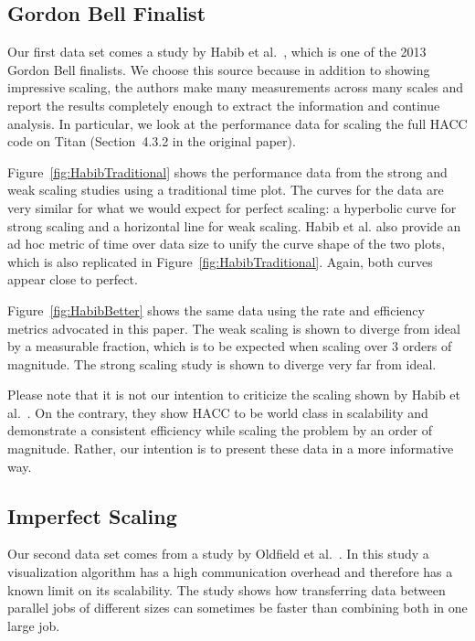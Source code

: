 \documentclass[conference]{IEEEtran}
\newcommand*{\scite}[1]{~\cite{#1}}
\newcommand{\etal}{et al.\xspace}
\begin{document}
\subsection{Gordon Bell Finalist}

\noindent
Our first data set comes a study by Habib \etal\scite{Habib2013}, which is
one of the 2013 Gordon Bell finalists. We choose this source because in
addition to showing impressive scaling, the authors make many measurements
across many scales and report the results completely enough to extract the
information and continue analysis. In particular, we look at the
performance data for scaling the full HACC code on Titan (Section~4.3.2 in
the original paper).

Figure~\ref{fig:HabibTraditional} shows the performance data from the
strong and weak scaling studies using a traditional time plot. The curves
for the data are very similar for what we would expect for perfect scaling:
a hyperbolic curve for strong scaling and a horizontal line for weak
scaling. Habib \etal also provide an ad hoc metric of time over data size
to unify the curve shape of the two plots, which is also replicated in
Figure~\ref{fig:HabibTraditional}. Again, both curves appear close to
perfect.

Figure~\ref{fig:HabibBetter} shows the same data using the rate and
efficiency metrics advocated in this paper. The weak scaling is shown to
diverge from ideal by a measurable fraction, which is to be expected when
scaling over 3 orders of magnitude. The strong scaling study is shown to
diverge very far from ideal.

Please note that it is not our intention to criticize the scaling shown by
Habib \etal\scite{Habib2013}. On the contrary, they show HACC to be world
class in scalability and demonstrate a consistent efficiency while scaling
the problem by an order of magnitude. Rather, our intention is to present
these data in a more informative way.

\subsection{Imperfect Scaling}

\noindent
Our second data set comes from a study by Oldfield
\etal\scite{Oldfield2014,Rogers2013}. In this study a visualization
algorithm has a high communication overhead and therefore has a known limit
on its scalability. The study shows how transferring data between parallel
jobs of different sizes can sometimes be faster than combining both in one
large job.
\end{document}
